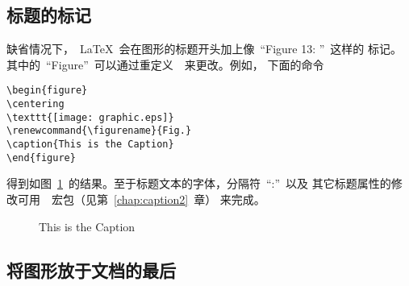 \subsection{标题的标记}\label{ssec:captionlabel}

缺省情况下，~\LaTeX{}~会在图形的标题开头加上像~``Figure 13: ''~这样的
标记。其中的~``Figure''~可以通过重定义~~来更改。例如，
下面的命令
\begin{Verbatim}[xleftmargin=1cm]
\begin{figure} 
\centering 
\texttt{[image: graphic.eps]} 
\renewcommand{\figurename}{Fig.} 
\caption{This is the Caption} 
\end{figure}
\end{Verbatim}
得到如图~\ref{fig:figname}~的结果。至于标题文本的字体，分隔符~``:''~以及
其它标题属性的修改可用~~宏包（见第~\ref{chap:caption2}~章）
来完成。

\clearpage

\begin{figure} 
	\centering
	\resizebox{2in}{!}{\usebox{\graphic}}
	\renewcommand{\figurename}{Fig.} 
	\caption{This is the Caption}\label{fig:figname} 
\end{figure}

\subsection{将图形放于文档的最后}\label{ssec:endfloat}

